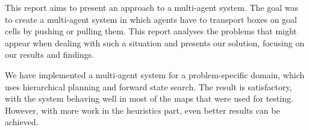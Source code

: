 

This report aims to present an approach to a multi-agent system. The goal was to create a multi-agent system
in which agents have to transport boxes on goal cells by pushing or pulling them. This report analyses the
problems that might appear when dealing with such a situation and presents our solution, focusing on our
results and findings.

We have implemented a multi-agent system for a problem-specific domain, which uses hierarchical planning and
forward state search. The result is satisfactory, with the system behaving well in most of the maps that were
used for testing. However, with more work in the heuristics part, even better results can be achieved.
